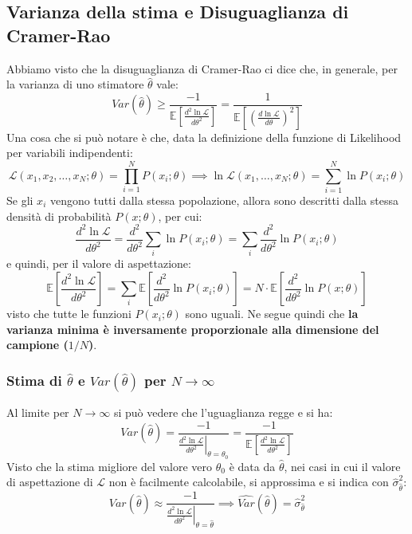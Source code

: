 \documentclass[openany,a4paper,12pt]{book}
\providecommand{\mathscr}[1]{\mathcal{#1}}
\theoremstyle{remark}
\begin{document}
\subsection{Varianza della stima e Disuguaglianza di Cramer-Rao}
Abbiamo visto che la disuguaglianza di Cramer-Rao ci dice che, in generale, per la varianza di uno stimatore $\hat{\theta}$ vale:
\begin{equation}
    Var(\hat{\theta}) \ge \frac{-1}{\mathbb{E}\left[ \frac{d^2 \ln \mathscr{L}}{d\theta^2} \right]} = \frac{1}{\mathbb{E}\left[ \left( \frac{d \ln \mathscr{L}}{d\theta} \right)^2 \right]}
    \label{eq:var_like}
\end{equation}
Una cosa che si può notare è che, data la definizione della funzione di Likelihood per variabili indipendenti:
\begin{equation}
    \mathscr{L}(x_1, x_2, \dots, x_N; \theta) = \prod_{i=1}^N P(x_i; \theta) \implies \ln \mathscr{L}(x_1, \dots, x_N; \theta) = \sum_{i=1}^N \ln P(x_i; \theta)
\end{equation}
Se gli $x_i$ vengono tutti dalla stessa popolazione, allora sono descritti dalla stessa densità di probabilità $P(x; \theta)$, per cui:
\begin{equation*}
    \frac{d^2 \ln \mathscr{L}}{d\theta^2} = \frac{d^2}{d\theta^2} \sum_i \ln P(x_i; \theta) = \sum_i \frac{d^2}{d\theta^2} \ln P(x_i; \theta)
\end{equation*}
e quindi, per il valore di aspettazione:
\begin{equation*}
    \mathbb{E}\left[ \frac{d^2 \ln \mathscr{L}}{d\theta^2} \right] = \sum_i \mathbb{E}\left[ \frac{d^2}{d\theta^2} \ln P(x_i; \theta) \right] = N \cdot \mathbb{E}\left[ \frac{d^2}{d\theta^2} \ln P(x; \theta) \right]
\end{equation*}
visto che tutte le funzioni $P(x_i; \theta)$ sono uguali. Ne segue quindi che \textbf{la varianza minima è inversamente proporzionale alla dimensione del campione ($1/N$)}.

\subsubsection*{Stima di \texorpdfstring{$\hat{\theta}$}{} e \texorpdfstring{$Var(\hat{\theta})$}{} per \texorpdfstring{$N \to \infty$}{}}
Al limite per $N \to \infty$ si può vedere che l'uguaglianza regge e si ha:
\begin{equation*}
    Var(\hat{\theta}) = \frac{-1}{\left. \frac{d^2 \ln \mathscr{L}}{d\theta^2} \right|_{\theta = \theta_0}} = \frac{-1}{\mathbb{E}\left[ \frac{d^2 \ln \mathscr{L}}{d\theta^2} \right]}
\end{equation*}
Visto che la stima migliore del valore vero $\theta_0$ è data da $\hat{\theta}$, nei casi in cui il valore di aspettazione di $\mathscr{L}$ non è facilmente calcolabile, si approssima e si indica con $\hat{\sigma}_{\hat{\theta}}^2$:
\begin{equation}
    Var(\hat{\theta}) \approx \frac{-1}{\left. \frac{d^2 \ln \mathscr{L}}{d\theta^2} \right|_{\theta = \hat{\theta}}} \implies \widehat{Var}(\hat{\theta}) = \hat{\sigma}_{\hat{\theta}}^2
\end{equation}
\end{document}
